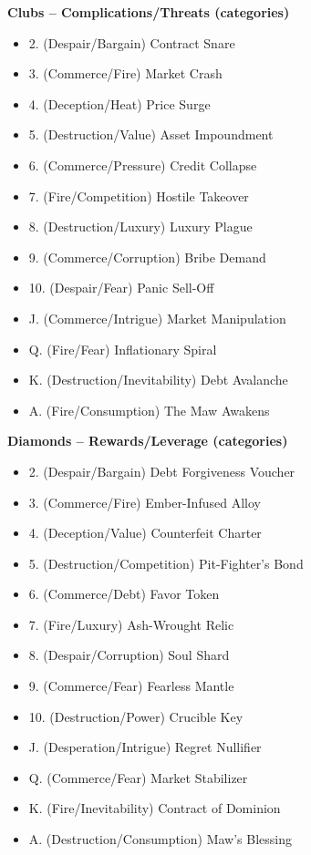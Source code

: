 \documentclass[11pt,letterpaper]{article}
\newcommand{\patronbox}[1]{\noindent\textbf{#1}\\}
\begin{document}
\patronbox{Clubs -- Complications/Threats (categories)}
\begin{multicols}{2}
\begin{itemize}[leftmargin=*]
    \item 2. (Despair/Bargain) Contract Snare
    \item 3. (Commerce/Fire) Market Crash
    \item 4. (Deception/Heat) Price Surge
    \item 5. (Destruction/Value) Asset Impoundment
    \item 6. (Commerce/Pressure) Credit Collapse
    \item 7. (Fire/Competition) Hostile Takeover
    \item 8. (Destruction/Luxury) Luxury Plague
    \item 9. (Commerce/Corruption) Bribe Demand
    \item 10. (Despair/Fear) Panic Sell-Off
    \item J. (Commerce/Intrigue) Market Manipulation
    \item Q. (Fire/Fear) Inflationary Spiral
    \item K. (Destruction/Inevitability) Debt Avalanche
    \item A. (Fire/Consumption) The Maw Awakens
\end{itemize}
\end{multicols}

\patronbox{Diamonds -- Rewards/Leverage (categories)}
\begin{multicols}{2}
\begin{itemize}[leftmargin=*]
    \item 2. (Despair/Bargain) Debt Forgiveness Voucher
    \item 3. (Commerce/Fire) Ember-Infused Alloy
    \item 4. (Deception/Value) Counterfeit Charter
    \item 5. (Destruction/Competition) Pit-Fighter's Bond
    \item 6. (Commerce/Debt) Favor Token
    \item 7. (Fire/Luxury) Ash-Wrought Relic
    \item 8. (Despair/Corruption) Soul Shard
    \item 9. (Commerce/Fear) Fearless Mantle
    \item 10. (Destruction/Power) Crucible Key
    \item J. (Desperation/Intrigue) Regret Nullifier
    \item Q. (Commerce/Fear) Market Stabilizer
    \item K. (Fire/Inevitability) Contract of Dominion
    \item A. (Destruction/Consumption) Maw's Blessing
\end{itemize}
\end{multicols}
\end{document}
